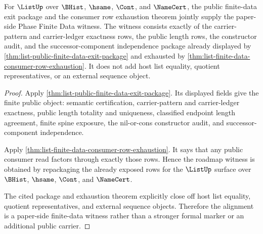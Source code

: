 \begin{theorem}
\label{thm:list-index-public-closure-alignment}
For $\ListUp$ over $\BHist$, $\hsame$, $\Cont$, and $\NameCert$, the public
finite-data exit package and the consumer row exhaustion theorem jointly supply
the paper-side Phase Finite Data witness. The witness consists exactly of the
carrier-pattern and carrier-ledger exactness rows, the public length rows, the
constructor audit, and the successor-component independence package already
displayed by
\autoref{thm:list-public-finite-data-exit-package} and exhausted by
\autoref{thm:list-finite-data-consumer-row-exhaustion}. It does not add host
list equality, quotient representatives, or an external sequence object.
\end{theorem}
\begin{proof}
Apply \autoref{thm:list-public-finite-data-exit-package}. Its displayed fields
give the finite public object: semantic certification, carrier-pattern and
carrier-ledger exactness, public length totality and uniqueness, classified
endpoint length agreement, finite spine exposure, the nil-or-cons constructor
audit, and successor-component independence.

Apply \autoref{thm:list-finite-data-consumer-row-exhaustion}. It says that any
public consumer read factors through exactly those rows. Hence the roadmap
witness is obtained by repackaging the already exposed rows for the
$\ListUp$ surface over $\BHist$, $\hsame$, $\Cont$, and $\NameCert$.

The cited package and exhaustion theorem explicitly close off host list
equality, quotient representatives, and external sequence objects. Therefore
the alignment is a paper-side finite-data witness rather than a stronger
formal marker or an additional public carrier.
\end{proof}
